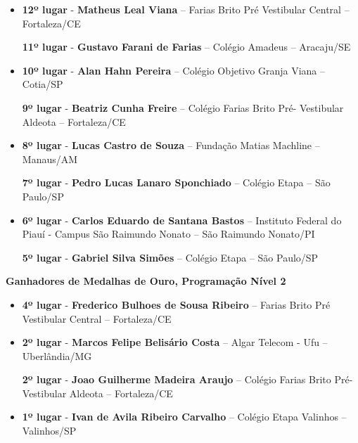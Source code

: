 \documentclass{article}
\begin{document}
\begin{itemize}
\item
\textbf{12º lugar} - \textbf{Matheus Leal Viana} – Farias Brito Pré Vestibular Central – Fortaleza/CE


\textbf{11º lugar} - \textbf{Gustavo Farani de Farias} – Colégio Amadeus – Aracaju/SE



\item
\textbf{10º lugar} - \textbf{Alan Hahn Pereira} – Colégio Objetivo Granja Viana – Cotia/SP


\textbf{9º lugar} - \textbf{Beatriz Cunha Freire} – Colégio Farias Brito Pré- Vestibular Aldeota – Fortaleza/CE



\item
\textbf{8º lugar} - \textbf{Lucas Castro de Souza} – Fundação Matias Machline – Manaus/AM


\textbf{7º lugar} - \textbf{Pedro Lucas Lanaro Sponchiado} – Colégio Etapa – São Paulo/SP



\item
\textbf{6º lugar} - \textbf{Carlos Eduardo de Santana Bastos} – Instituto Federal do Piauí - Campus São Raimundo Nonato – São Raimundo Nonato/PI


\textbf{5º lugar} - \textbf{Gabriel Silva Simões} – Colégio Etapa – São Paulo/SP



\end{itemize}

\textbf{\color{blue}Ganhadores de Medalhas de Ouro, \color{black}Programação Nível 2}
\color{black}

\begin{itemize}
\item
\textbf{4º lugar} - \textbf{Frederico Bulhoes de Sousa Ribeiro} – Farias Brito Pré Vestibular Central – Fortaleza/CE



\item
\textbf{2º lugar} - \textbf{Marcos Felipe Belisário Costa} – Algar Telecom - Ufu – Uberlândia/MG


\textbf{2º lugar} - \textbf{Joao Guilherme Madeira Araujo} – Colégio Farias Brito Pré- Vestibular Aldeota – Fortaleza/CE



\item
\textbf{1º lugar} - \textbf{Ivan de Avila Ribeiro Carvalho} – Colégio Etapa Valinhos – Valinhos/SP



\end{itemize}
\end{document}
